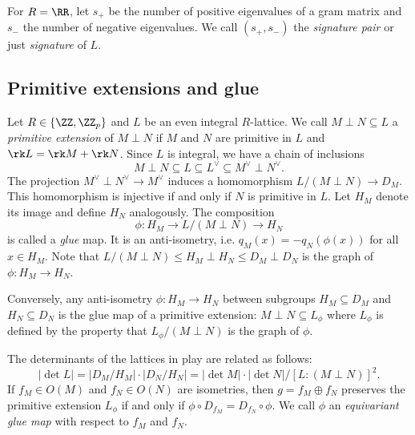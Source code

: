 For $R=\RR$, let $s_+$ be the number of positive eigenvalues of a gram matrix and $s_-$ the number of negative eigenvalues. We call $(s_+,s_-)$ the \emph{signature pair} or just \emph{signature} of $L$.


\subsection{Primitive extensions and glue}
Let $R \in \{\ZZ, \ZZ_p\}$ and $L$ be an even integral $R$-lattice.
We call $M \perp N \subseteq L$ a \emph{primitive extension} of $M \perp N$ if $M$ and $N$ are primitive in $L$ and $\rk L = \rk M + \rk N$.
Since $L$ is integral, we have a chain of inclusions
\[M \perp N \subseteq L \subseteq L^\vee \subseteq M^\vee \perp N^\vee.\]
The projection $M^\vee \perp N^\vee \to M^\vee$ induces a homomorphism $L/(M \perp N) \to D_M$. This homomorphism is injective if and only if $N$ is primitive in $L$.
Let $H_M$ denote its image and define $H_N$ analogously. The composition
\[\phi \colon H_M \to L/(M \perp N) \to H_N\]
is called a \emph{glue} map. It is an anti-isometry, i.e. $q_M(x) = -q_N(\phi(x))$ for all $x \in H_M$. Note that $L/(M\perp N) \leq H_M \perp H_N \leq D_M \perp D_N$ is the graph of $\phi\colon H_M \to H_N$.

Conversely, any anti-isometry $\phi \colon H_M \to H_N$ between subgroups $H_M \subseteq D_M$ and $H_N \subseteq D_N$ is the glue map of a primitive extension: $M \perp N \subseteq L_\phi$ where $L_\phi$ is defined by
the property that $L_\phi/(M \perp N)$ is the graph of $\phi$.

The determinants of the lattices in play are related as follows:
\[\lvert\det L\rvert = \lvert D_M/H_M \rvert \cdot \lvert D_N/H_N \rvert = \lvert \det M \rvert \cdot \lvert \det N \rvert/[L : (M \perp N)]^2.\]
If $f_M \in O(M)$ and $f_N \in O(N)$ are isometries, then $g = f_M \oplus f_N$ preserves the primitive extension $L_\phi$ if and only if $\phi \circ D_{f_M} = D_{f_N} \circ \phi$. We call $\phi$ an \emph{equivariant glue map} with respect to $f_M$ and $f_N$.


